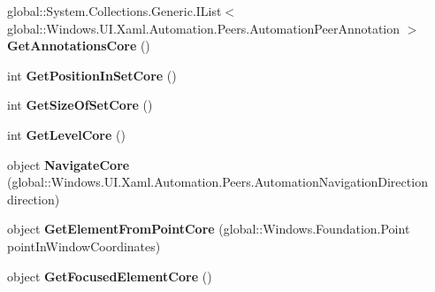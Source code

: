 \begin{DoxyCompactItemize}
global\+::\+System.\+Collections.\+Generic.\+I\+List$<$ global\+::\+Windows.\+U\+I.\+Xaml.\+Automation.\+Peers.\+Automation\+Peer\+Annotation $>$ {\bfseries Get\+Annotations\+Core} ()
\item 
\mbox{\label{interface_windows_1_1_u_i_1_1_xaml_1_1_automation_1_1_peers_1_1_i_automation_peer_overrides3_afef3ad83240660e412bb003fdb94af98}} 
int {\bfseries Get\+Position\+In\+Set\+Core} ()
\item 
\mbox{\label{interface_windows_1_1_u_i_1_1_xaml_1_1_automation_1_1_peers_1_1_i_automation_peer_overrides3_a3ca3266f1f29e7576d6e7037cb4e1d77}} 
int {\bfseries Get\+Size\+Of\+Set\+Core} ()
\item 
\mbox{\label{interface_windows_1_1_u_i_1_1_xaml_1_1_automation_1_1_peers_1_1_i_automation_peer_overrides3_a52902ce9fb7640616f2937232f64cb71}} 
int {\bfseries Get\+Level\+Core} ()
\item 
\mbox{\label{interface_windows_1_1_u_i_1_1_xaml_1_1_automation_1_1_peers_1_1_i_automation_peer_overrides3_ab89d7e1926fed035b4d1e4a6ebd84e6a}} 
object {\bfseries Navigate\+Core} (global\+::\+Windows.\+U\+I.\+Xaml.\+Automation.\+Peers.\+Automation\+Navigation\+Direction direction)
\item 
\mbox{\label{interface_windows_1_1_u_i_1_1_xaml_1_1_automation_1_1_peers_1_1_i_automation_peer_overrides3_a22a573b6a3dbcdc3cda6486e9dffb748}} 
object {\bfseries Get\+Element\+From\+Point\+Core} (global\+::\+Windows.\+Foundation.\+Point point\+In\+Window\+Coordinates)
\item 
\mbox{\label{interface_windows_1_1_u_i_1_1_xaml_1_1_automation_1_1_peers_1_1_i_automation_peer_overrides3_a85c5473c92efce557199ce1f32af01fc}} 
object {\bfseries Get\+Focused\+Element\+Core} ()

\end{DoxyCompactItemize}
